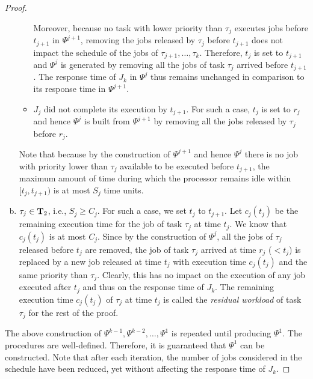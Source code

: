 \begin{proof}
\begin{enumerate}[(a)]
\begin{itemize}
Moreover, because no task with lower priority than $\tau_j$ executes jobs before $t_{j+1}$ in $\Psi^{j+1}$, removing the jobs released by $\tau_j$ before $t_{j+1}$ does not impact the schedule of the jobs of $\tau_{j+1}, \ldots, \tau_{k}$. Therefore, $t_j$ is set to $t_{j+1}$ and $\Psi^j$ is generated by removing all the jobs of task $\tau_j$ arrived before $t_{j+1}$. The response time of $J_{k}$ in $\Psi^j$ thus remains unchanged in comparison to its response time in $\Psi^{j+1}$. 
\item $J_{j}$ did not complete its execution by $t_{j+1}$. For such a case, $t_{j}$ is set to $r_j$ and hence $\Psi^j$ is built from $\Psi^{j+1}$ by removing all the jobs released by $\tau_j$ before $r_j$. 
\end{itemize}
Note that because by the construction of $\Psi^{j+1}$ and hence $\Psi^j$ there is no job with priority lower than $\tau_j$ available to be executed before $t_{j+1}$, the maximum amount of time during which the processor remains idle within $[t_j, t_{j+1})$ is at most $S_j$ time units.
\item $\tau_j \in {\bf T}_2$, i.e., $S_j \geq C_j$. For such a case, we set $t_{j}$ to $t_{j+1}$. Let $c_j(t_j)$ be the remaining execution time for the job of task $\tau_j$ at time $t_j$. We know that $c_j(t_j)$ is at most $C_j$. Since by the construction of $\Psi^j$, all the jobs of $\tau_j$ released before $t_j$ are removed, the job of task $\tau_j$ arrived at time $r_j$ ($< t_j$) is replaced by a new job released at time $t_j$ with execution time $c_j(t_j)$ and the same priority than $\tau_j$. Clearly, this has no impact on the execution of any job executed after $t_j$ and thus on the response time of $J_k$. The remaining execution time $c_j(t_j)$ of $\tau_j$ at time $t_j$ is called the \emph{residual workload} of task $\tau_j$ for the rest of the proof.
\end{enumerate}
 
The above construction of $\Psi^{k-1}, \Psi^{k-2}, \ldots, \Psi^1$ is repeated until producing $\Psi^1$. The procedures are well-defined. Therefore, it is guaranteed that $\Psi^1$ can be constructed. Note that after each iteration, the number of jobs considered in the schedule have been reduced, yet without affecting the response time of $J_k$. 


\end{proof}
